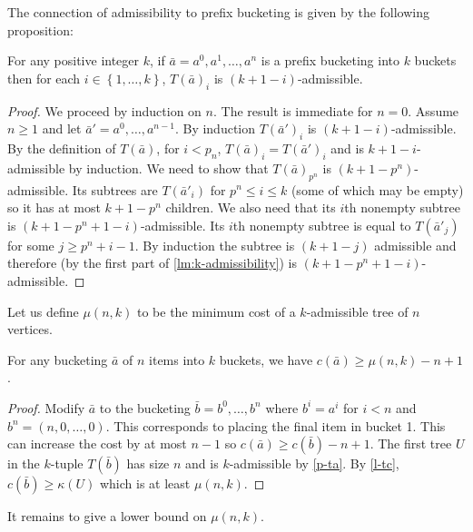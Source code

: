 \documentclass[unicode,review]{siamart1116}
\newcommand{\natInt}[2]{ \left\{ #1, \dotsc, #2 \right\} }
\numberwithin{theorem}{section}
\begin{document}
The connection of admissibility to prefix bucketing is given by the following proposition:

\begin{proposition}\label{p-ta}
For any positive integer $k$, if $\bar{a} = a^0,a^1,\dotsc,a^n$ is a prefix bucketing into $k$ buckets then
for each $i \in \natInt{1}{k}$, $T(\bar{a})_i$ is $(k+1-i)$-admissible.
\end{proposition}

\begin{proof}
We proceed by induction on $n$.  The result is immediate for $n=0$.   Assume $n\geq 1$
and let $\bar{a}'=a^0,\ldots,a^{n-1}$.  By induction $T(\bar{a}')_i$ is $(k+1-i)$-admissible.
By the definition of $T(\bar{a})$, for $i <p_n$, $T(\bar{a})_i=T(\bar{a}')_i$ and is
 $k+1-i$-admissible by induction.  We need to show that $T(\bar{a})_{p^n}$ is
$(k+1-p^n)$-admissible.   Its subtrees are $T(\bar{a}'_i)$ for $p^n \leq i \leq k$ (some of which may be empty)
so it has at most $k+1-p^n$ children. We also need that its $i$th nonempty subtree is $(k+1-p^n + 1 -i)$-admissible. 
Its $i$th nonempty subtree is equal to $T(\bar{a}'_j)$ for
some $j \geq p^n+i-1$. By induction the subtree is $(k+1-j)$ admissible and therefore (by the first part of \cref{lm:k-admissibility}) is $(k+1-p^n +1 - i)$-admissible. 
\end{proof}

Let us define $\mu(n,k)$ to be the minimum cost of a $k$-admissible tree of $n$ vertices.

\begin{proposition}
\label{prop:mu}
For any bucketing $\bar{a}$ of $n$ items into $k$ buckets, we have $c(\bar{a}) \geq \mu(n,k) - n+1$.
\end{proposition}


\begin{proof}
Modify $\bar{a}$ to the bucketing $\bar{b}=b^0,\ldots,b^n$ where $b^i=a^i$
for $i<n$ and $b^n=(n,0,\ldots,0)$.  This corresponds to placing the final item in bucket 1.
This can increase the cost by at most $n-1$ so
 $c(\bar{a}) \geq c(\bar{b}) - n+1$.  The first tree $U$ in the  $k$-tuple  $T(\bar{b})$ has  size $n$ and is $k$-admissible
by \cref{p-ta}.  By \cref{l-tc}, $c(\bar{b}) \geq \kappa(U)$ which
is at least $\mu(n,k)$.  
\end{proof}

It remains to give a  lower bound on $\mu(n,k)$.  
\end{document}
